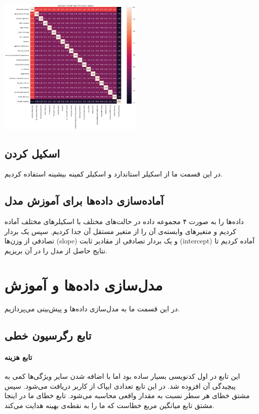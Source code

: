 \documentclass[11pt, a4paper, oneside]{book}
\begin{document}
	\begin{center}
	\includegraphics[width=7cm]{./images/heatmap2.png}
\end{center}
		\subsection{اسکیل کردن}
		در این قسمت ما از اسکیلر استاندارد و اسکیلر کمینه بیشینه استفاده کردیم.
		\subsection{آماده‌سازی داده‌ها برای آموزش مدل}	
داده‌ها را به صورت ۴ مجموعه داده در حالت‌های مختلف با اسکیلرهای مختلف آماده کردیم و متغیرهای وابسته‌ی آن را از متغیر مستقل آن جدا کردیم. سپس یک بردار تصادفی از وزن‌ها (slope) و یک بردار تصادفی از مقادیر ثابت (intercept) آماده کردیم تا نتایج حاصل از مدل را در آن بریزیم.
\section{مدل‌سازی داده‌ها و آموزش}
در این قسمت ما به مدل‌سازی داده‌ها و پیش‌بینی می‌پردازیم.
\subsection{تابع رگرسیون خطی}
\paragraph{تابع هزینه}
این تابع در اول کدنویسی بسیار ساده بود اما با اضافه شدن سایر ویژگی‌ها کمی به پیچیدگی آن افزوده شد.
در این تابع تعدادی ایپاک از کاربر دریافت می‌شود. سپس مشتق خطای هر سطر نسبت به مقدار واقعی محاسبه می‌شود. تابع خطای ما در اینجا مشتق تابع میانگین مربع خطاست که ما را به نقطه‌ی بهینه هدایت می‌کند.
\end{document}
